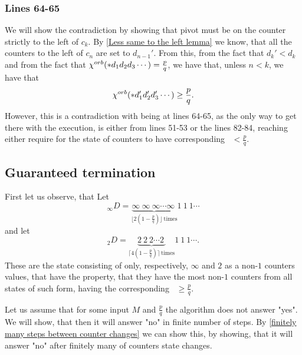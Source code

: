 \subsubsection{Lines 64-65}
We will show the contradiction by showing that pivot must be on 
the counter strictly to the left of $c_k$. 
By \ref{Less same to the left lemma} 
we know, that all the counters to the left of $c_n$ are set to $d_{n-1}'$. 
From this, from the fact that $d_k' < d_k$ and 
from the fact that ${\chi^{orb}(*d_1d_2d_3\cdots)} = \frac{p}{q}$, 
we have that, unless $n < k$, we have that 
\begin{equation}
{\chi^{orb}(*d_1'd_2'd_3'\cdots)} \geq \frac{p}{q}.
\end{equation}
However, this is a contradiction with being at lines 64-65, as 
the only way to get there with the execution, is either from lines 
51-53 or the lines 82-84, reaching either require for the state of counters to have 
corresponding \Eoc\ $<\frac{p}{q}$.


\subsection{Guaranteed termination}
First let us observe, that 
Let 
\begin{equation}
_\infty D = \underbrace{\infty\ \infty\ \infty\cdots 
\infty\ }_{\lfloor 2(1-\frac{p}{q})\rfloor\ \mathrm{times}}1\ 1\ 1\cdots
\end{equation}
and let 
\begin{equation}
_2D = \underbrace{2\ 2\ 2\cdots 
2\ }_{\lceil 4(1-\frac{p}{q})\rceil\ \mathrm{times}}1\ 1\ 1\cdots.
\end{equation}
These are the state consisting of only, respectively, $\infty$ and $2$ as a non-$1$ counters 
values, that have the property, that they have the most non-$1$ counters from all 
states of such form, having the corresponding \Eoc\ $\geq\frac{p}{q}$. 

Let us assume that for some input $M$ and $\frac{p}{q}$ the algorithm does not answer "yes". 
We will show, that then it will answer "no" in finite number of steps. By 
\ref{finitely many steps between counter changes} 
we can show this, by showing, that it will answer "no" after 
finitely many of counters state changes. 
